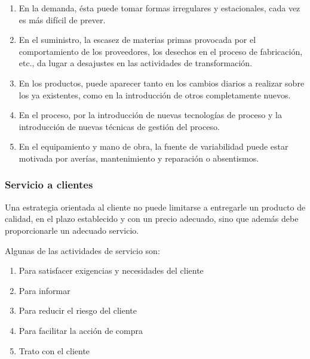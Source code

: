 \documentclass[10pt,a4paper,spanish]{report}
\begin{document}
                        \begin{enumerate}[---]
                              \item En la demanda, ésta puede tomar formas irregulares y estacionales, cada vez es más difícil de prever.
                              \item En el suministro, la escasez de materias primas provocada por el comportamiento de los proveedores, los desechos en el proceso de fabricación, etc., da lugar a desajustes en las actividades de transformación.
                              \item En los productos, puede aparecer tanto en los cambios diarios a realizar sobre los ya existentes, como en la introducción de otros completamente nuevos.
                              \item En el proceso, por la introducción de nuevas tecnologías de proceso y la introducción de nuevas técnicas de gestión del proceso.
                              \item En el equipamiento y mano de obra, la fuente de variabilidad puede estar motivada por averías, mantenimiento y reparación o absentismos.
                        \end{enumerate}

                  \subsubsection{\textcolor[rgb]{0.9,0.7,0.6}Servicio a clientes}

                        Una estrategia orientada al cliente no puede limitarse a entregarle un producto de calidad, en el plazo establecido y con un precio adecuado, sino que además debe proporcionarle un adecuado servicio.

                        Algunas de las actividades de servicio son:

                        \begin{enumerate}[---]
                              \item Para satisfacer exigencias y necesidades del cliente
                              \item Para informar
                              \item Para reducir el riesgo del cliente
                              \item Para facilitar la acción de compra
                              \item Trato con el cliente
                        \end{enumerate}
\end{document}
